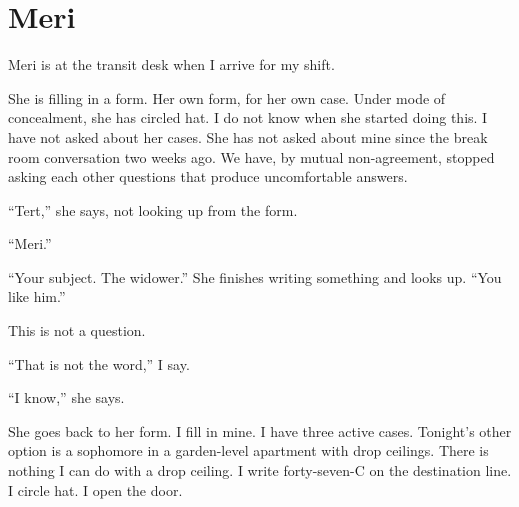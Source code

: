 
\chapter{Meri}

Meri is at the transit desk when I arrive for my shift.

She is filling in a form. Her own form, for her own case. Under mode of concealment, she has circled hat. I do not know when she started doing this. I have not asked about her cases. She has not asked about mine since the break room conversation two weeks ago. We have, by mutual non-agreement, stopped asking each other questions that produce uncomfortable answers.

``Tert,'' she says, not looking up from the form.

``Meri.''

``Your subject. The widower.'' She finishes writing something and looks up. ``You like him.''

This is not a question.

``That is not the word,'' I say.

``I know,'' she says.

She goes back to her form. I fill in mine. I have three active cases. Tonight's other option is a sophomore in a garden-level apartment with drop ceilings. There is nothing I can do with a drop ceiling. I write forty-seven-C on the destination line. I circle hat. I open the door.

